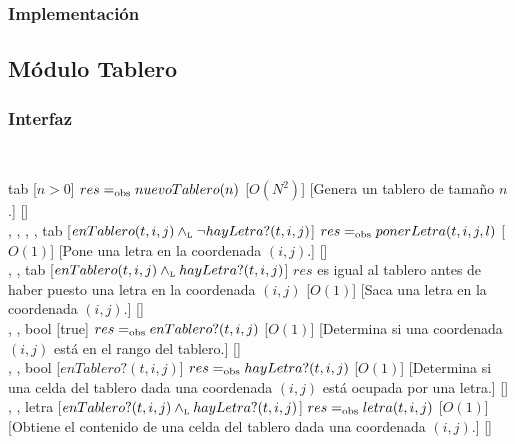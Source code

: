 \subsubsection{Implementación}

\subsection{Módulo Tablero}
\begin{interfaz}{\subsubsection{Interfaz}}
  \\
  \usa{\falta}
  \par\noindent
  \begin{operaciones}
    {
    }{tab}
    [$n>0$]
    {$res=_{\mathrm{obs}} nuevoTablero(n)$}
    [$O(N^{2})$]
    [Genera un tablero de tamaño $n$.]
    [\falta]\\

    \noindent{}
    {
      ,
      ,
      ,
      ,
    }{tab}
    [$enTablero(t,i,j)\land_{\mathrm{\scriptscriptstyle{L}}}\lnot hayLetra?(t,i,j)$]
    {$res=_{\mathrm{obs}} ponerLetra(t,i,j,l)$}
    [$O(1)$]
    [Pone una letra en la coordenada $(i,j)$.]
    [\falta]\\

    \noindent{}
    {
      ,
      ,
    }{tab}
    [$enTablero(t,i,j)\land_{\mathrm{\scriptscriptstyle{L}}} hayLetra?(t,i,j)$]
    {$res$ es igual al tablero antes de haber puesto una letra en la coordenada $(i,j)$}
    [$O(1)$]
    [Saca una letra en la coordenada $(i,j)$.]
    [\falta]\\

    \noindent{}
    {, , }{bool}
    [true]
    {$res=_{\mathrm{obs}} enTablero?(t,i,j)$}
    [$O(1)$]
    [Determina si una coordenada $(i,j)$ está en el rango del tablero.]
    [\falta]\\

    \noindent{}
    {, , }{bool}
    [$enTablero?(t,i,j)$]
    {$res=_{\mathrm{obs}} hayLetra?(t,i,j)$}
    [$O(1)$]
    [Determina si una celda del tablero dada una coordenada $(i,j)$ está ocupada por una letra.]
    [\falta]\\

    \noindent{}
    {, , }{letra}
    [$enTablero?(t,i,j)\land_{\mathrm{\scriptscriptstyle{L}}} hayLetra?(t,i,j)$]
    {$res=_{\mathrm{obs}} letra(t,i,j)$}
    [$O(1)$]
    [Obtiene el contenido de una celda del tablero dada una coordenada $(i,j)$.]
    [\falta]\\

  \end{operaciones}
\end{interfaz}
